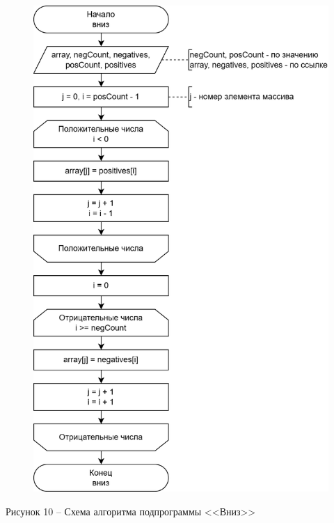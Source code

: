 \documentclass[a4paper,14pt]{extarticle}
\begin{document}
  \pagebreak
  \begin{figure}[h]
    \centering
    \includegraphics[width=0.65\linewidth]{images/s-2-6}
  \end{figure}
  \begin{center}
    Рисунок 10 – Схема алгоритма подпрограммы <<Вниз>>
  \end{center}
\end{document}
